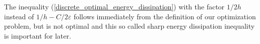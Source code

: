 \begin{remark}
	The inequality (\ref{discrete_optimal_energy_dissipation}) with the factor $ 1/2h $ instead of $ 1/h- C/2\varepsilon $ follows immediately from the definition of our optimization problem, but is not optimal and this so called sharp energy dissipation inequality is important for later.
\end{remark}








